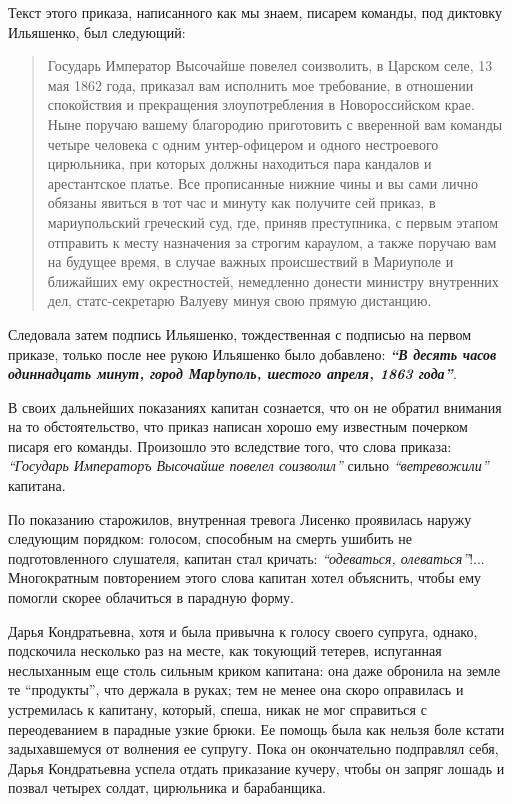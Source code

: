 \documentclass[a4paper,20pt]{report}
\begin{document}
Текст этого приказа, написанного как мы знаем, писарем
команды, под диктовку Ильяшенко, был следующий: 

\begin{quote}
\em\bfseries

Государь Император Высочайше повелел соизволить, в Царском селе, 13 мая 1862
года, приказал вам исполнить мое требование, в отношении спокойствия и
прекращения злоупотребления в Новороссийском крае. Ныне поручаю вашему
благородию приготовить с вверенной вам команды четыре человека с одним
унтер-офицером и одного нестроевого цирюльника, при которых должны
находиться пара кандалов и арестантское платье. Все прописанные нижние
чины и вы сами лично обязаны явиться в тот час и минуту как получите
сей приказ, в мариупольский греческий суд, где, приняв преступника, с
первым этапом отправить к месту назначения за строгим караулом, а также
поручаю вам на будущее время, в случае важных происшествий в Мариуполе
и ближайших ему окрестностей, немедленно донести министру внутренних
дел, статс-секретарю Валуеву минуя свою прямую дистанцию.
	
\end{quote}
Следовала
затем подпись Ильяшенко, тождественная с подписью на
первом приказе, только после нее рукою Ильяшенко было
добавлено: \textbf{\em ``В десять часов одиннадцать минут, город
Марbуполь, шестого апреля, 1863 года''}.

В своих дальнейших показаниях капитан сознается, 
что он не обратил внимания на то обстоятельство,
что приказ написан хорошо ему известным почерком
писаря его команды. Произошло это вследствие того, что
слова приказа: \emph{``Государь Императоръ Высочайше повелел
соизволил''} сильно \emph{``ветревожили''} капитана.

По показанию старожилов, внутренная тревога Лисенко
проявилась наружу следующим порядком: голосом, способным на смерть ушибить 
не подготовленного слушателя,
капитан стал кричать: \emph{``одеваться, олеваться''}!... Многократным
повторением этого слова капитан хотел объяснить, 
чтобы ему помогли скорее облачиться в парадную форму.

Дарья Кондратьевна, хотя и была привычна к голосу своего супруга, однако,
подскочила несколько раз на месте, как токующий тетерев, испуганная неслыханным
еще столь сильным криком капитана: она даже обронила на земле те ``продукты'',
что держала в руках; тем не менее она скоро оправилась и устремилась к
капитану, который, спеша, никак не мог справиться с переодеванием в парадные
узкие брюки.  Ее помощь была как нельзя боле кстати задыхавшемуся от волнения
ее супругу.  Пока он окончательно подправлял себя, Дарья Кондратьевна успела
отдать приказание кучеру, чтобы он запряг лошадь и позвал четырех солдат,
цирюльника и барабанщика.
\end{document}
